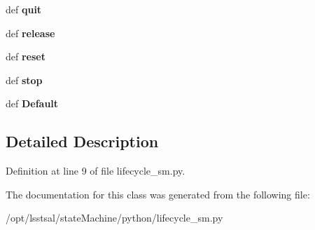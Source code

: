 \begin{DoxyCompactItemize}
\item 
\hypertarget{classlifecycle__sm_1_1sal_lifecycle_state_af69c0c00e0ef0e130c941a1d66e98d6a}{def {\bfseries quit}}\label{classlifecycle__sm_1_1sal_lifecycle_state_af69c0c00e0ef0e130c941a1d66e98d6a}

\item 
\hypertarget{classlifecycle__sm_1_1sal_lifecycle_state_ae0565b30564f67f4301352d1d1fd7a5f}{def {\bfseries release}}\label{classlifecycle__sm_1_1sal_lifecycle_state_ae0565b30564f67f4301352d1d1fd7a5f}

\item 
\hypertarget{classlifecycle__sm_1_1sal_lifecycle_state_a2473828a62ffdbe1ebc82d6d85444578}{def {\bfseries reset}}\label{classlifecycle__sm_1_1sal_lifecycle_state_a2473828a62ffdbe1ebc82d6d85444578}

\item 
\hypertarget{classlifecycle__sm_1_1sal_lifecycle_state_a1e6866c4e041d64a7c09eccd59c62591}{def {\bfseries stop}}\label{classlifecycle__sm_1_1sal_lifecycle_state_a1e6866c4e041d64a7c09eccd59c62591}

\item 
\hypertarget{classlifecycle__sm_1_1sal_lifecycle_state_ae96b7114294d954c7ad2eaf62e564611}{def {\bfseries Default}}\label{classlifecycle__sm_1_1sal_lifecycle_state_ae96b7114294d954c7ad2eaf62e564611}

\end{DoxyCompactItemize}


\subsection{Detailed Description}


Definition at line 9 of file lifecycle\-\_\-sm.\-py.



The documentation for this class was generated from the following file\-:\begin{DoxyCompactItemize}
\item 
/opt/lsstsal/state\-Machine/python/lifecycle\-\_\-sm.\-py\end{DoxyCompactItemize}
